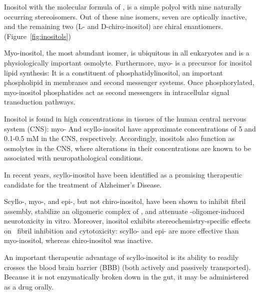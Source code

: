 

Inositol with the molecular formula of , is a simple polyol with nine naturally occurring stereoisomers. Out of these nine isomers, seven are optically inactive, and the remaining two (L- and D-chiro-inositol) are chiral enantiomers.(Figure~\ref{fig:inositols})


Myo-inositol, the most abundant isomer, is ubiquitous in all eukaryotes and is a physiologically important osmolyte.  Furthermore, myo- is a precursor for inositol lipid synthesis: It is a constituent of phosphatidylinositol, an important phospholipid in membranes and second messenger systems. Once phosphorylated, myo-inositol phosphatides act as second messengers in intracellular signal transduction pathways.\cite{Fisher:2002tk}

Inositol is found in high concentrations in tissues of the human central nervous system (CNS): myo- And scyllo-inositol have approximate concentrations of 5 and 0.1-0.5 mM in the CNS, respectively.\cite{Fisher:2002tk} Accordingly, inositols also function as osmolytes in the CNS, where alterations in their concentrations are known to be associated with neuropathological conditions.\cite{Michaelis:1993gf, Fisher:2002tk}

In recent years, scyllo-inositol have been identified as a promising therapeutic candidate for the treatment of Alzheimer's Disease.

Scyllo-, myo-, and epi-, but not chiro-inositol, have been shown to inhibit  fibril assembly, stabilize an oligomeric complex of , and attenuate \abeta-oligomer-induced neurotoxicity in vitro. Moreover, inositol exhibits stereochemistry-specific effects on \abeta\  fibril inhibition and cytotoxicity: scyllo- and epi- are more effective than myo-inositol, whereas chiro-inositol was inactive.\cite{McLaurin:2000bq}

An important therapeutic advantage of scyllo-inositol is its ability to readily crosses the bloodbrain barrier (BBB) (both actively and passively transported). Because it is not enzymatically broken down in the gut, it may be administered as a drug orally. 
		

